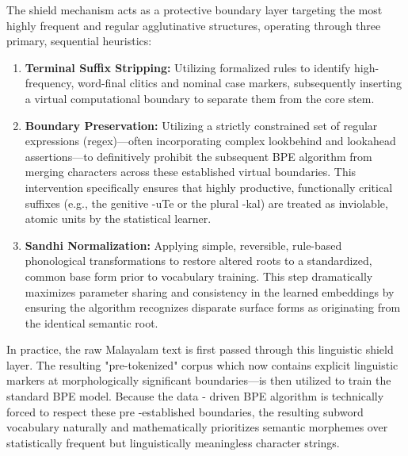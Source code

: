 \documentclass[12pt]{article}
\begin{document}
	The shield mechanism acts as a protective boundary layer targeting the most highly frequent and regular agglutinative structures, operating through three primary, sequential heuristics: 
	\begin{enumerate}
		\item
		\textbf{Terminal Suffix Stripping: }Utilizing formalized rules to identify high-frequency, word-final clitics and nominal case markers, subsequently inserting a virtual computational boundary to separate them from the core stem.
		\item
		\textbf{Boundary Preservation:} Utilizing a strictly constrained set of regular expressions (regex)—often incorporating complex lookbehind and lookahead assertions—to definitively prohibit the subsequent BPE algorithm from merging characters across these established virtual boundaries. This intervention specifically ensures that highly productive, functionally critical suffixes (e.g., the genitive -uTe or the plural -kal) are treated as inviolable, atomic units by the statistical learner.
		\item
		\textbf{Sandhi Normalization:} Applying simple, reversible, rule-based phonological transformations to restore altered roots to a standardized, common base form prior to vocabulary training. This step dramatically maximizes parameter sharing and consistency in the learned embeddings by ensuring the algorithm recognizes disparate surface forms as originating from the identical semantic root. 
		
	\end{enumerate}
	In practice, the raw Malayalam text is first passed through this linguistic shield layer. The resulting "pre-tokenized" corpus which now contains explicit linguistic markers at morphologically significant boundaries—is then utilized to train the standard BPE model. Because the data - driven BPE algorithm is technically forced to respect these pre -established boundaries, the resulting subword vocabulary naturally and mathematically prioritizes semantic morphemes over statistically frequent but linguistically meaningless character strings. 
	
	
	
	\printbibliography
	
\end{document}
